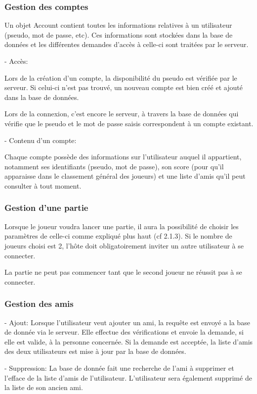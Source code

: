 \documentclass[a4paper,12pt]{article}
\begin{document}
\subsubsection{Gestion des comptes}
Un objet Account contient toutes les informations relatives à un utilisateur (pseudo, mot de passe, etc). Ces informations sont stockées dans la base de données et les différentes demandes d'accès à celle-ci sont traitées par le serveur.

- Accès:

Lors de la création d'un compte, la disponibilité du pseudo est vérifiée par le serveur. Si celui-ci n'est pas trouvé, un nouveau compte est bien créé et ajouté dans la base de données.

Lors de la connexion, c'est encore le serveur, à travers la base de données qui vérifie que le pseudo et le mot de passe saisis correspondent à un compte existant.

- Contenu d'un compte:

Chaque compte possède des informations sur l'utilisateur auquel il appartient, notamment ses identifiants (pseudo, mot de passe), son score (pour qu'il apparaisse dans le classement général des joueurs) et une liste d'amis qu'il peut consulter à tout moment.

\subsubsection{Gestion d'une partie}

Lorsque le joueur voudra lancer une partie,
il aura la possibilité de choisir les paramètres de celle-ci comme expliqué plus haut (cf 2.1.3). Si le nombre de joueurs choisi est 2, l'hôte doit obligatoirement inviter un autre utilisateur à se connecter.

La partie ne peut pas commencer tant que le second joueur ne réussit pas à se connecter.
\subsubsection{Gestion des amis}

- Ajout: Lorsque l'utilisateur veut ajouter un ami, la requête est envoyé a la base de donnée via le serveur. Elle effectue des vérifications et envoie la demande, si elle est valide, à la personne concernée. Si la demande est acceptée, la liste d'amis des deux utilisateurs est mise à jour par la base de données.

- Suppression: La base de donnée fait une recherche de l'ami à supprimer et l'efface de la liste d'amis de l'utilisateur. L'utilisateur sera également supprimé de la liste de son ancien ami.
\end{document}
